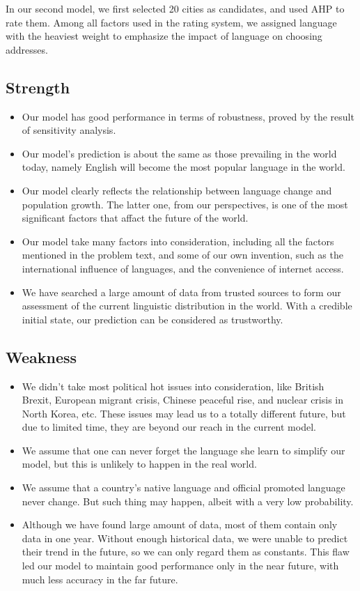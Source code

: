 \documentclass{mcmthesis}
\begin{document}
In our second model, we first selected 20 cities as candidates, and used AHP to rate them. Among all factors used in the rating system, we assigned language with the heaviest weight to emphasize the impact of language on choosing addresses.
\subsection{Strength}
\begin{itemize}
    \item Our model has good performance in terms of robustness, proved by the result of sensitivity analysis.
    \item Our model's prediction is about the same as those prevailing in the world today, namely English will become the most popular language in the world.
    \item Our model clearly reflects the relationship between language change and population growth. The latter one, from our perspectives, is one of the most significant factors that affact the future of the world.
    \item Our model take many factors into consideration, including all the factors mentioned in the problem text, and some of our own invention, such as the international influence of languages, and the convenience of internet access.
    \item We have searched a large amount of data from trusted sources to form our assessment of the current linguistic distribution in the world. With a credible initial state, our prediction can be considered as trustworthy.
\end{itemize}
\subsection{Weakness}
\begin{itemize}
    \item We didn't take most political hot issues into consideration, like British Brexit, European migrant crisis, Chinese peaceful rise, and nuclear crisis in North Korea, etc. These issues may lead us to a totally different future, but due to limited time, they are beyond our reach in the current model.
    \item We assume that one can never forget the language she learn to simplify our model, but this is unlikely to happen in the real world.
    \item We assume that a country's native language and official promoted language never change. But such thing may happen, albeit with a very low probability.
    \item Although we have found large amount of data, most of them contain only data in one year. Without enough historical data, we were unable to predict their trend in the future, so we can only regard them as constants. This flaw led our model to maintain good performance only in the near future, with much less accuracy in the far future.
\end{itemize}
\end{document}
